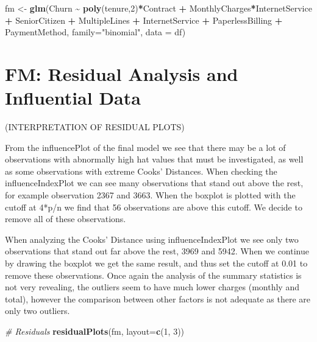 \documentclass[
]{article}
\newenvironment{Shaded}{\begin{snugshade}}{\end{snugshade}}
\newcommand{\AttributeTok}[1]{\textcolor[rgb]{0.13,0.29,0.53}{#1}}
\newcommand{\CommentTok}[1]{\textcolor[rgb]{0.56,0.35,0.01}{\textit{#1}}}
\newcommand{\DecValTok}[1]{\textcolor[rgb]{0.00,0.00,0.81}{#1}}
\newcommand{\FunctionTok}[1]{\textcolor[rgb]{0.13,0.29,0.53}{\textbf{#1}}}
\newcommand{\NormalTok}[1]{#1}
\newcommand{\OtherTok}[1]{\textcolor[rgb]{0.56,0.35,0.01}{#1}}
\newcommand{\SpecialCharTok}[1]{\textcolor[rgb]{0.81,0.36,0.00}{\textbf{#1}}}
\newcommand{\StringTok}[1]{\textcolor[rgb]{0.31,0.60,0.02}{#1}}
\begin{document}
\begin{Shaded}
\begin{Highlighting}[]
\NormalTok{fm }\OtherTok{\textless{}{-}} \FunctionTok{glm}\NormalTok{(Churn }\SpecialCharTok{\textasciitilde{}} \FunctionTok{poly}\NormalTok{(tenure,}\DecValTok{2}\NormalTok{)}\SpecialCharTok{*}\NormalTok{Contract }\SpecialCharTok{+}\NormalTok{ MonthlyCharges}\SpecialCharTok{*}\NormalTok{InternetService }\SpecialCharTok{+}\NormalTok{ SeniorCitizen }\SpecialCharTok{+}\NormalTok{ MultipleLines }\SpecialCharTok{+}\NormalTok{ InternetService }\SpecialCharTok{+}\NormalTok{ PaperlessBilling }\SpecialCharTok{+}\NormalTok{ PaymentMethod, }\AttributeTok{family=}\StringTok{"binomial"}\NormalTok{, }\AttributeTok{data =}\NormalTok{ df)}
\end{Highlighting}
\end{Shaded}

\hypertarget{fm-residual-analysis-and-influential-data}{%
\section{FM: Residual Analysis and Influential
Data}\label{fm-residual-analysis-and-influential-data}}

(INTERPRETATION OF RESIDUAL PLOTS)

From the influencePlot of the final model we see that there may be a lot
of observations with abnormally high hat values that must be
investigated, as well as some observations with extreme Cooks'
Distances. When checking the influenceIndexPlot we can see many
observations that stand out above the rest, for example observation 2367
and 3663. When the boxplot is plotted with the cutoff at 4*p/n we find
that 56 observations are above this cutoff. We decide to remove all of
these observations.

When analyzing the Cooks' Distance using influenceIndexPlot we see only
two observations that stand out far above the rest, 3969 and 5942. When
we continue by drawing the boxplot we get the same result, and thus set
the cutoff at 0.01 to remove these observations. Once again the analysis
of the summary statistics is not very revealing, the outliers seem to
have much lower charges (monthly and total), however the comparison
between other factors is not adequate as there are only two outliers.

\begin{Shaded}
\begin{Highlighting}[]
\CommentTok{\# Residuals}
\FunctionTok{residualPlots}\NormalTok{(fm, }\AttributeTok{layout=}\FunctionTok{c}\NormalTok{(}\DecValTok{1}\NormalTok{, }\DecValTok{3}\NormalTok{))}
\end{Highlighting}
\end{Shaded}
\end{document}
